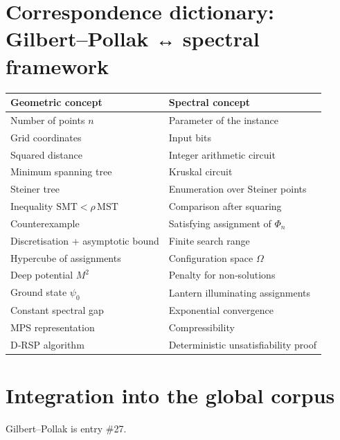 \documentclass[11pt,a4paper]{article}
\begin{document}
\section{Correspondence dictionary: Gilbert–Pollak ↔ spectral framework}

\begin{center}
\small
\begin{tabular}{@{}l|l@{}}
\toprule
\textbf{Geometric concept} & \textbf{Spectral concept} \\
\midrule
Number of points $n$ & Parameter of the instance \\
Grid coordinates & Input bits \\
Squared distance & Integer arithmetic circuit \\
Minimum spanning tree & Kruskal circuit \\
Steiner tree & Enumeration over Steiner points \\
Inequality $\text{SMT} < \rho\,\text{MST}$ & Comparison after squaring \\
Counterexample & Satisfying assignment of $\Phi_n$ \\
Discretisation + asymptotic bound & Finite search range \\
Hypercube of assignments & Configuration space $\Omega$ \\
Deep potential $M^2$ & Penalty for non‑solutions \\
Ground state $\psi_0$ & Lantern illuminating assignments \\
Constant spectral gap & Exponential convergence \\
MPS representation & Compressibility \\
D‑RSP algorithm & Deterministic unsatisfiability proof \\
\bottomrule
\end{tabular}
\end{center}

\section{Integration into the global corpus}

Gilbert–Pollak is entry \#27.
\end{document}
